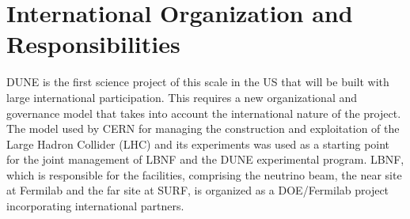 





\section{International Organization and Responsibilities}

DUNE is the first science project of this scale in the US that will be built with large
international participation. This requires a new organizational and governance model that takes into account the international nature of the project.
The
model used by CERN for managing the construction and exploitation of the Large Hadron Collider (LHC) and its experiments was used as a starting point for the joint management of LBNF and the DUNE experimental program. 
LBNF, which is responsible for the facilities, comprising the neutrino beam, the near site at Fermilab and the far site at SURF, is organized as a
DOE/Fermilab project incorporating international partners. 

